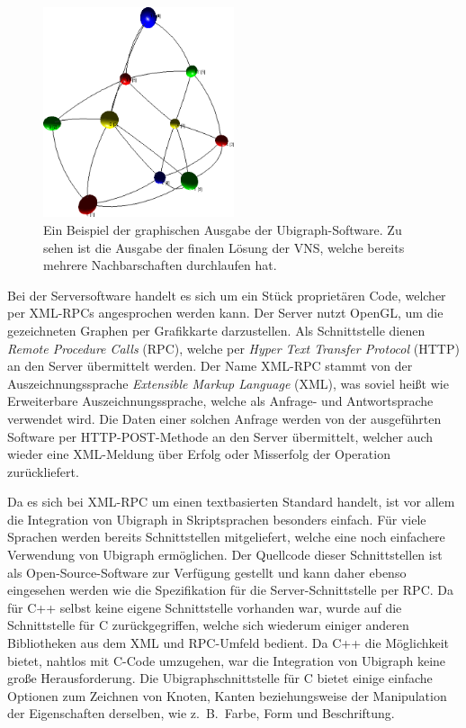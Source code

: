 \begin{figure}
\centering
\includegraphics[width=0.5\textwidth]{img/ubigraph.png}
\caption[Ein Beispiel der graphischen Ausgabe der Ubigraph-Software]{Ein Beispiel der graphischen Ausgabe der Ubigraph-Software. Zu sehen ist die Ausgabe der finalen Lösung der VNS, welche bereits mehrere Nachbarschaften durchlaufen hat.}
\label{img:ubigraph}
\end{figure}
Bei der Serversoftware handelt es sich um ein Stück proprietären Code, welcher per XML-RPCs angesprochen werden kann. Der Server nutzt OpenGL, um die gezeichneten Graphen per Grafikkarte darzustellen. Als
Schnittstelle dienen \textit{Remote Procedure Calls} (RPC), welche per \textit{Hyper Text Transfer Protocol} (HTTP) an den Server übermittelt werden. Der Name XML-RPC stammt von der Auszeichnungssprache
\textit{Extensible Markup Language} (XML), was soviel heißt wie Erweiterbare Auszeichnungssprache, welche als Anfrage- und Antwortsprache verwendet wird. Die Daten einer solchen Anfrage werden von der
ausgeführten Software per HTTP-POST-Methode an den Server übermittelt, welcher auch wieder eine XML-Meldung über Erfolg oder Misserfolg der Operation zurückliefert. 

Da es sich bei XML-RPC um einen textbasierten Standard handelt, ist vor allem die Integration von Ubigraph in Skriptsprachen besonders einfach. Für viele Sprachen werden bereits Schnittstellen mitgeliefert,
welche eine noch einfachere Verwendung von Ubigraph ermöglichen. Der Quellcode dieser Schnittstellen ist als Open-Source-Software zur Verfügung gestellt und kann daher ebenso eingesehen werden wie die
Spezifikation für die Server-Schnittstelle per RPC\@. Da für C++ selbst keine eigene Schnittstelle vorhanden war, wurde auf die Schnittstelle für C zurückgegriffen, welche sich wiederum einiger anderen Bibliotheken
aus dem XML und RPC-Umfeld bedient. Da C++ die Möglichkeit bietet, nahtlos mit C-Code umzugehen, war die Integration von Ubigraph keine große Herausforderung. Die Ubigraphschnittstelle für C bietet einige
einfache Optionen zum Zeichnen von Knoten, Kanten beziehungsweise der Manipulation der Eigenschaften derselben, wie z.~B.\ Farbe, Form und Beschriftung.
